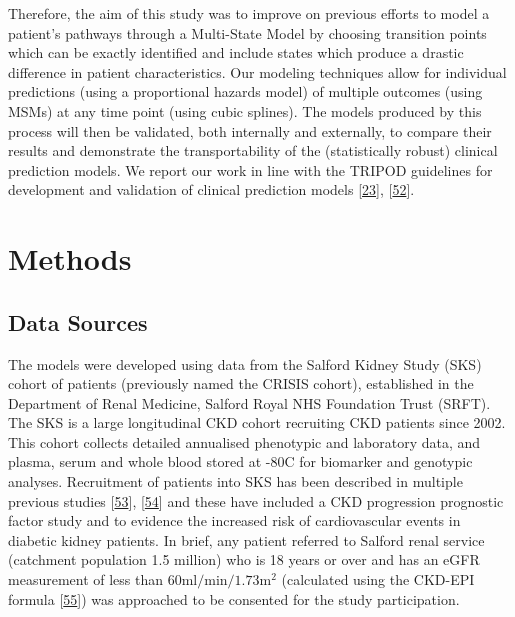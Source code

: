 \documentclass[
]{article}
\begin{document}
Therefore, the aim of this study was to improve on previous efforts to model a patient's pathways through a Multi-State Model by choosing transition points which can be exactly identified and include states which produce a drastic difference in patient characteristics. Our modeling techniques allow for individual predictions (using a proportional hazards model) of multiple outcomes (using MSMs) at any time point (using cubic splines). The models produced by this process will then be validated, both internally and externally, to compare their results and demonstrate the transportability of the (statistically robust) clinical prediction models. We report our work in line with the TRIPOD guidelines for development and validation of clinical prediction models {[}\protect\hyperlink{ref-collins_transparent_2015}{23}{]}, {[}\protect\hyperlink{ref-moons_transparent_2015}{52}{]}.

\hypertarget{methods-1}{%
\section{Methods}\label{methods-1}}

\hypertarget{data-sources}{%
\subsection{Data Sources}\label{data-sources}}

The models were developed using data from the Salford Kidney Study (SKS) cohort of patients (previously named the CRISIS cohort), established in the Department of Renal Medicine, Salford Royal NHS Foundation Trust (SRFT). The SKS is a large longitudinal CKD cohort recruiting CKD patients since 2002. This cohort collects detailed annualised phenotypic and laboratory data, and plasma, serum and whole blood stored at -80\textdegree C for biomarker and genotypic analyses. Recruitment of patients into SKS has been described in multiple previous studies {[}\protect\hyperlink{ref-hoefield_factors_2010}{53}{]}, {[}\protect\hyperlink{ref-chinnadurai_increased_2019-1}{54}{]} and these have included a CKD progression prognostic factor study and to evidence the increased risk of cardiovascular events in diabetic kidney patients. In brief, any patient referred to Salford renal service (catchment population 1.5 million) who is 18 years or over and has an eGFR measurement of less than \(60\textrm{ml}/\textrm{min}/1.73\textrm{m}^2\) (calculated using the CKD-EPI formula {[}\protect\hyperlink{ref-levey_new_2009}{55}{]}) was approached to be consented for the study participation.
\end{document}
